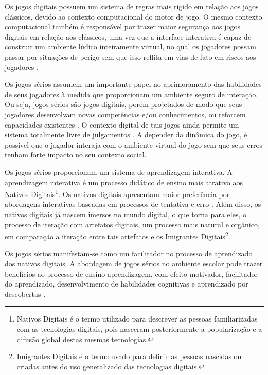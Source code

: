 \vspace{-0,1cm}

Os jogos digitais possuem um sistema de regras mais rígido em relação aos jogos clássicos, devido ao contexto computacional do motor de jogo. O mesmo contexto computacional também é responsável por trazer maior segurança aos jogos digitais em relação aos clássicos, uma vez que a interface interativa é capaz de construir um ambiente lúdico inteiramente virtual, no qual os jogadores possam passar por situações de perigo sem que isso reflita em vias de fato em riscos aos jogadores \cite{lucchese2009conceituaccao}.



Os jogos sérios assumem um importante papel no aprimoramento das habilidades de seus jogadores à medida que proporcionam um ambiente seguro de interação. Ou seja, jogos sérios são jogos digitais, porém projetados de modo que seus jogadores desenvolvam novas competências e/ou conhecimentos, ou reforcem capacidades existentes \cite{boller2017play}. O contexto digital de tais jogos ainda permite um sistema totalmente livre de julgamentos \cite{women2018international}. A depender da dinâmica do jogo, é possível que o jogador interaja com o ambiente virtual do jogo sem que seus erros tenham forte impacto no seu contexto social.

Os jogos sérios proporcionam um sistema de aprendizagem interativa. A aprendizagem interativa é um processo didático de ensino mais atrativo aos Nativos Digitais\footnote{Nativos Digitais é o termo utilizado para descrever as pessoas familiarizadas com as tecnologias digitais, pois nasceram posteriormente a popularização e a difusão global destas mesmas tecnologias.}. Os nativos digitais apresentam maior preferência por abordagens interativas baseadas em processos de tentativa e erro \cite{pescador2010tecnologias}. Além disso, os nativos digitais já nascem imersos no mundo digital, o que torna para eles, o processo de iteração com artefatos digitais, um processo mais natural e orgânico, em comparação a iteração entre tais artefatos e os Imigrantes Digitais\footnote{Imigrantes Digitais é o termo usado para definir as pessoas nascidas ou criadas antes do uso generalizado das tecnologias digitais.}.



Os jogos sérios manifestam-se como um facilitador no processo de aprendizado dos nativos digitais. A abordagem de jogos sérios no ambiente escolar pode trazer benefícios ao processo de ensino-aprendizagem, com efeito motivador, facilitador do aprendizado, desenvolvimento de habilidades cognitivas e aprendizado por descobertas \cite{de2017move4math}.


